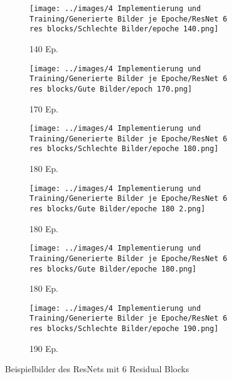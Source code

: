 \begin{figure}[H]
    \centering
    \begin{subfigure}[b]{0.12\textwidth}
        \centering
        \texttt{[image: ../images/4 Implementierung und Training/Generierte Bilder je Epoche/ResNet 6 res blocks/Schlechte Bilder/epoche 140.png]}
        \caption{140 Ep.}
    \end{subfigure}
    \hspace{1em}%
    \begin{subfigure}[b]{0.12\textwidth}
        \centering
        \texttt{[image: ../images/4 Implementierung und Training/Generierte Bilder je Epoche/ResNet 6 res blocks/Gute Bilder/epoch 170.png]}
        \caption{170 Ep.}
    \end{subfigure}
    \hspace{1em}%
    \begin{subfigure}[b]{0.12\textwidth}
        \centering
        \texttt{[image: ../images/4 Implementierung und Training/Generierte Bilder je Epoche/ResNet 6 res blocks/Schlechte Bilder/epoche 180.png]}
        \caption{180 Ep.}
    \end{subfigure}
    \hspace{1em}%
    \begin{subfigure}[b]{0.12\textwidth}
    \centering
    \texttt{[image: ../images/4 Implementierung und Training/Generierte Bilder je Epoche/ResNet 6 res blocks/Gute Bilder/epoche 180 2.png]}
    \caption{180 Ep.}
\end{subfigure}
\hspace{1em}%
    \begin{subfigure}[b]{0.12\textwidth}
    \centering
    \texttt{[image: ../images/4 Implementierung und Training/Generierte Bilder je Epoche/ResNet 6 res blocks/Gute Bilder/epoche 180.png]}
    \caption{180 Ep.}
\end{subfigure}
\hspace{1em}%
    \begin{subfigure}[b]{0.12\textwidth}
    \centering
    \texttt{[image: ../images/4 Implementierung und Training/Generierte Bilder je Epoche/ResNet 6 res blocks/Schlechte Bilder/epoche 190.png]}
    \caption{190 Ep.}
\end{subfigure}
        \caption{Beispielbilder des ResNets mit 6 Residual Blocks}
        \label{fig:resnet-6-blocks}
\end{figure}